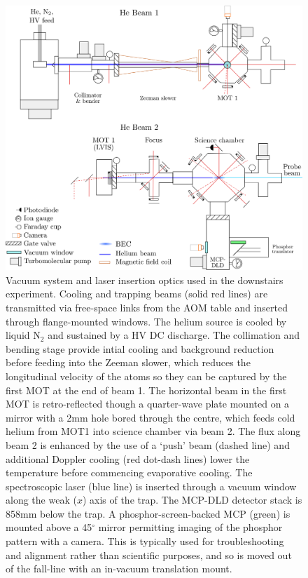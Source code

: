 		\begin{figure}
		\centering
		\includegraphics[width=\textwidth]{fig/apparatus/vacuum_schematic_simplified}
		\caption{Vacuum system and laser insertion optics used in the downstairs experiment. Cooling and trapping beams (solid red lines) are transmitted via free-space links from the AOM table and inserted through flange-mounted windows. The helium source is cooled by liquid $\textrm{N}_2$ and sustained by a HV DC discharge. The collimation and bending stage provide intial cooling and background reduction before feeding into the Zeeman slower, which reduces the longitudinal velocity of the atoms so they can be captured by the first MOT at the end of beam 1. The horizontal beam in the first MOT is retro-reflected though a quarter-wave plate mounted on a mirror with a 2mm hole bored through the centre, which feeds cold helium from MOT1 into science chamber via beam 2. The flux along beam 2 is enhanced by the use of a `push' beam (dashed line) and additional Doppler cooling (red dot-dash lines) lower the temperature before commencing evaporative cooling. The spectroscopic laser (blue line) is inserted through a vacuum window along the weak ($x$) axis of the trap. The MCP-DLD detector stack is 858mm below the trap. A phosphor-screen-backed MCP (green) is mounted above a 45$^\circ$ mirror permitting imaging of the phosphor pattern with a camera. This is typically used for troubleshooting and alignment rather than scientific purposes, and so is moved out of the fall-line with an in-vacuum translation mount.}
		\label{fig:apparatus}
	\end{figure}
	
